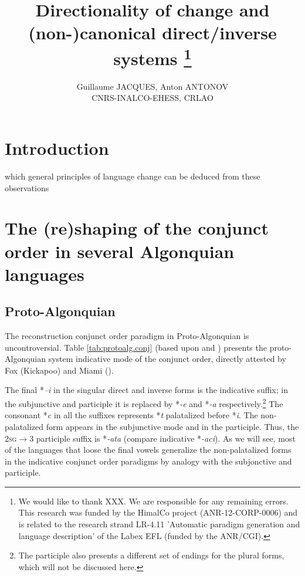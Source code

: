 \documentclass[twoside,a4paper,11pt]{article}
\newcommand{\ipa}[1]{{\phon\textit{#1}}}
\newcommand{\Σ}{\greek{Σ}}
\begin{document}
\linenumbers
\title{Directionality of change and   (non-)canonical direct/inverse systems \footnote{We would like to thank XXX. We are responsible for any remaining errors. This research was funded by the HimalCo project (ANR-12-CORP-0006) and is related to the research strand LR-4.11 'Automatic paradigm generation and language description' of the Labex EFL (funded by the ANR/CGI). } }

\author{Guillaume JACQUES, Anton ANTONOV\\ CNRS-INALCO-EHESS, CRLAO}
\maketitle
\section{Introduction}

which general principles of language change can be deduced from these observations


\section{The (re)shaping of the conjunct order in several Algonquian languages }


\subsection{Proto-Algonquian}
The reconstruction conjunct order paradigm in Proto-Algonquian is uncontroversial. Table \ref{tab:protoalg.conj} (based upon \citealt{bloomfield46proto} and \citealt{goddard00cheyenne}) presents the proto-Algonquian system indicative mode of the conjunct order, directly attested by Fox (Kickapoo) and Miami (\citealt{costa03miami}).

The final *\ipa{--i} in the singular direct and inverse forms is the indicative suffix; in the subjunctive and participle it is replaced by *\ipa{-e} and *\ipa{-a} respectively.\footnote{The participle also presents a different set of endings for the plural forms, which will not be discussed here.} The consonant *\ipa{c} in all the suffixes represents *\ipa{t} palatalized before *\ipa{i}. The non-palatalized form appears in the subjunctive mode and in the participle. Thus, the \textsc{2sg$\rightarrow$3} participle suffix is *\ipa{-ata} (compare indicative *\ipa{-aci}). As we will see, most of the  languages that loose the final vowels generalize the non-palatalized forms in the indicative conjunct order paradigms by analogy with the subjonctive and participle.
\end{document}
